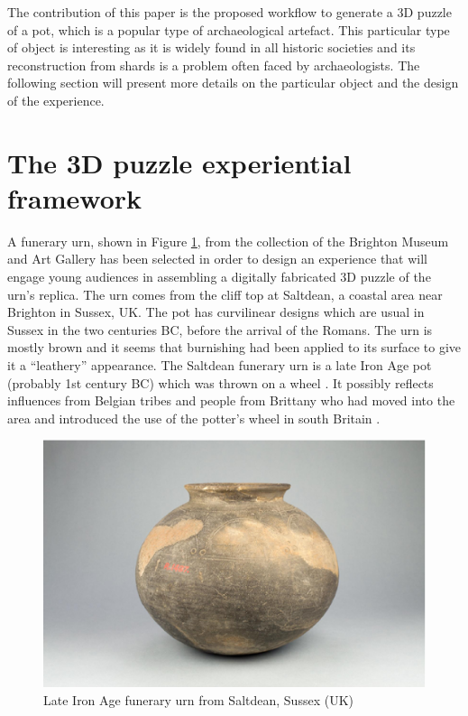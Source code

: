 \documentclass[acmlarge,screen]{acmart}
\begin{document}

The contribution of this paper is the proposed workflow to generate a 3D puzzle of a pot, which is a popular type of archaeological artefact. This particular type of object is interesting as it is widely found in all historic societies and its reconstruction from shards is a problem often faced by archaeologists. The following section will present more details on the particular object and the design of the experience.

\section{The 3D puzzle experiential framework}
\label{requirements}
A funerary urn, shown in Figure \ref{fig:pot}, from the collection of the Brighton Museum and Art Gallery has been selected in order to design an experience that will engage young audiences in assembling a digitally fabricated 3D puzzle of the urn's replica. The urn comes from the cliff top at Saltdean, a coastal area near Brighton in Sussex, UK. The pot has curvilinear designs which are usual in Sussex in the two centuries BC, before the arrival of the Romans. The urn is mostly brown and it seems that burnishing had been applied to its surface to give it a ``leathery'' appearance. The Saltdean funerary urn is a late Iron Age pot (probably 1st century BC) which was thrown on a wheel \cite{Toms1912}. It possibly reflects influences from Belgian tribes and people from Brittany who had moved into the area and introduced the use of the potter's wheel in south Britain \cite{Harding1974,Cunliffe1978,Adkins1982,Cunliffe1995}.

\begin{figure}[htb]
  \centering
  \includegraphics[width=0.6\linewidth]{images/pot}
  \caption{\label{fig:pot}
    Late Iron Age funerary urn from Saltdean, Sussex (UK)}
\end{figure}
\end{document}

